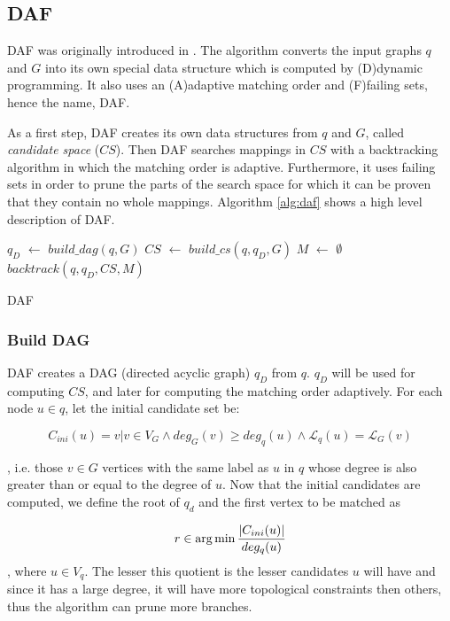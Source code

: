 \subsection{DAF}

DAF was originally introduced in \cite{Han2019EfficientSM}. The algorithm converts the input graphs $q$ and $G$ 
into its own special data structure which is computed by (D)dynamic programming. It also uses an 
(A)adaptive matching order and (F)failing sets, hence the name, DAF.

As a first step, DAF creates its own data structures from $q$ and $G$, called \emph{candidate space} ($CS$).
Then DAF searches mappings in $CS$ with a backtracking algorithm in which the matching order is adaptive.
Furthermore, it uses failing sets in order to prune the parts of the search space for which it can be
proven that they contain no whole mappings. Algorithm \ref{alg:daf} shows a high level description of DAF.

\begin{algorithm}[h]
    \SetAlgoLined\DontPrintSemicolon
    \nl $q_D$ $\gets$ $build\_dag(q, G)$\;
    \nl $CS$ $\gets$ $build\_cs(q, q_D, G)$\;
    \nl $M$ $\gets$ $\emptyset$\;
    \nl $backtrack(q, q_D, CS, M)$\;
    \label{alg:daf}
    \caption{DAF}
\end{algorithm}

\subsubsection{Build DAG}

DAF creates a DAG (directed acyclic graph) $q_D$ from $q$. $q_D$ will be used for computing $CS$, and later
for computing the matching order adaptively. For each node $u \in q$, let the initial candidate set be:

\[ C_{ini}(u) = {v | v \in V_G \land deg_G(v) \geq deg_q(u) \land \mathcal{L}_q(u) = \mathcal{L}_G(v)} \]

, i.e. those $v \in G$ vertices with the same label as $u$ in $q$ whose degree is also greater than or 
equal to the degree of $u$. Now that the initial candidates are computed, we define the root of $q_d$
and the first vertex to be matched as

\[ r \in \operatorname*{arg\,min} \frac{|C_{ini}(u)|}{deg_q(u)} \], where $u \in V_q$. The lesser this quotient is the 
lesser candidates $u$ will have and since it has a large degree, it will have more topological constraints 
then others, thus the algorithm can prune more branches.

